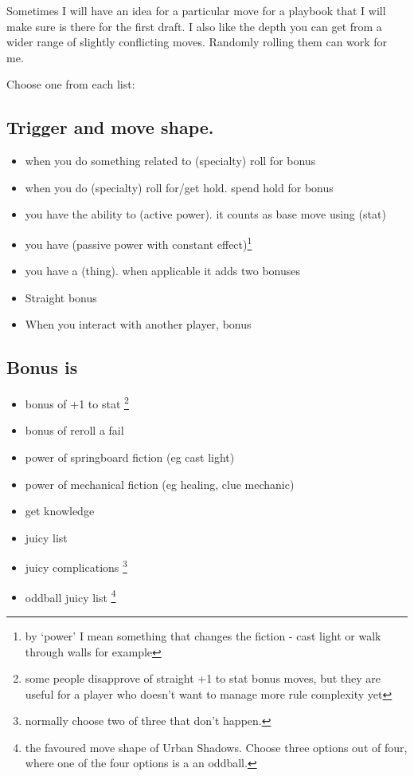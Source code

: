 \documentclass{tufte-handout}
\begin{document}
Sometimes I will have an idea for a particular move for a playbook that I will make sure is there for the first draft. I also like the depth you can get from a wider range of slightly conflicting moves. Randomly rolling them can work for me.

Choose one from each list:

\subsection{Trigger and move shape.}
\begin{itemize}
\item when you do something related to (specialty) roll for bonus
\item when you do (specialty) roll for/get hold. spend hold for bonus
\item you have the ability to (active power). it counts as base move using (stat)
\item you have (passive power with constant effect)\footnote{by `power' I mean something that changes the fiction - cast light or walk through walls for example}
\item you have a (thing). when applicable it adds two bonuses
\item Straight bonus
\item When you interact with another player, bonus
\end{itemize}

\subsection{Bonus is}
\begin{itemize}
\item bonus of +1 to stat  \footnote{some people disapprove of straight +1 to stat bonus moves, but they are useful for a player who doesn't want to manage more rule complexity yet}
\item bonus of reroll a fail
\item power of springboard fiction (eg cast light)
\item power of mechanical fiction (eg healing, clue mechanic)
\item get knowledge 
\item juicy list
\item juicy complications \footnote{normally choose two of three that don't happen.}
\item oddball juicy list \footnote{the favoured move shape of Urban Shadows. Choose three options out of four, where one of the four options is a an oddball.}
\end{itemize}
\end{document}
